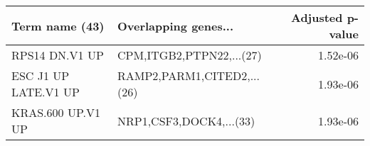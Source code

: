 \begin{tabular}{llr}
\toprule
      Term name (43) &       Overlapping genes... &  Adjusted p-value \\
\midrule
      RPS14 DN.V1 UP &   CPM,ITGB2,PTPN22,...(27) &          1.52e-06 \\
ESC J1 UP LATE.V1 UP & RAMP2,PARM1,CITED2,...(26) &          1.93e-06 \\
   KRAS.600 UP.V1 UP &    NRP1,CSF3,DOCK4,...(33) &          1.93e-06 \\
\bottomrule
\end{tabular}
